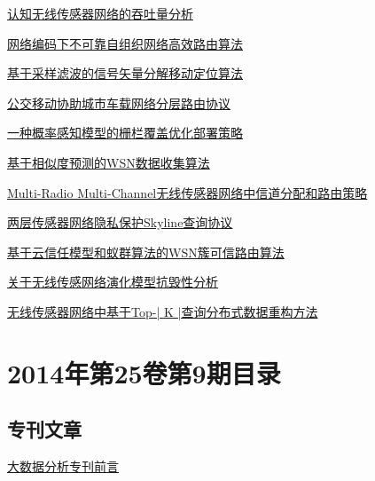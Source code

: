 \documentclass[a4paper]{article}
\begin{document}
\href{http://www.jos.org.cn/ch/reader/download_pdf.aspx?file_no=14006&year_id=2014&quarter_id=s1&falg=1}{认知无线传感器网络的吞吐量分析}

\href{http://www.jos.org.cn/ch/reader/download_pdf.aspx?file_no=14007&year_id=2014&quarter_id=s1&falg=1}{网络编码下不可靠自组织网络高效路由算法}

\href{http://www.jos.org.cn/ch/reader/download_pdf.aspx?file_no=14008&year_id=2014&quarter_id=s1&falg=1}{基于采样滤波的信号矢量分解移动定位算法}

\href{http://www.jos.org.cn/ch/reader/download_pdf.aspx?file_no=14009&year_id=2014&quarter_id=s1&falg=1}{公交移动协助城市车载网络分层路由协议}

\href{http://www.jos.org.cn/ch/reader/download_pdf.aspx?file_no=14010&year_id=2014&quarter_id=s1&falg=1}{一种概率感知模型的栅栏覆盖优化部署策略}

\href{http://www.jos.org.cn/ch/reader/download_pdf.aspx?file_no=14011&year_id=2014&quarter_id=s1&falg=1}{基于相似度预测的WSN数据收集算法}

\href{http://www.jos.org.cn/ch/reader/download_pdf.aspx?file_no=14012&year_id=2014&quarter_id=s1&falg=1}{Multi-Radio Multi-Channel无线传感器网络中信道分配和路由策略}

\href{http://www.jos.org.cn/ch/reader/download_pdf.aspx?file_no=14013&year_id=2014&quarter_id=s1&falg=1}{两层传感器网络隐私保护Skyline查询协议}

\href{http://www.jos.org.cn/ch/reader/download_pdf.aspx?file_no=14014&year_id=2014&quarter_id=s1&falg=1}{基于云信任模型和蚁群算法的WSN簇可信路由算法}

\href{http://www.jos.org.cn/ch/reader/download_pdf.aspx?file_no=14015&year_id=2014&quarter_id=s1&falg=1}{关于无线传感网络演化模型抗毁性分析}

\href{http://www.jos.org.cn/ch/reader/download_pdf.aspx?file_no=14016&year_id=2014&quarter_id=s1&falg=1}{无线传感器网络中基于Top-| K |查询分布式数据重构方法}


\section{\textbf{2014年第25卷第9期目录}}
\subsection{专刊文章}
\href{http://www.jos.org.cn/ch/reader/download_pdf.aspx?file_no=4652&year_id=2014&quarter_id=9&falg=1}{大数据分析专刊前言}
\end{document}
